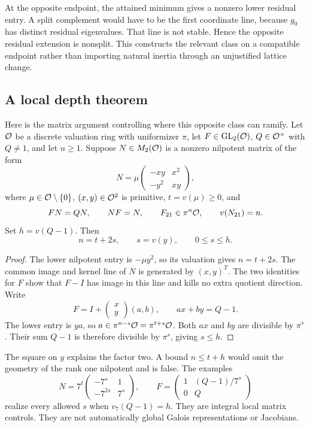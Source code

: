 At the opposite endpoint, the attained minimum gives a nonzero lower residual entry. A split complement would have to be the first coordinate line, because $g_0$ has distinct residual eigenvalues. That line is not stable. Hence the opposite residual extension is nonsplit. This constructs the relevant class on a compatible endpoint rather than importing natural inertia through an unjustified lattice change.

\subsection{A local depth theorem}
Here is the matrix argument controlling where this opposite class can ramify. Let $\mathcal O$ be a discrete valuation ring with uniformizer $\pi$, let $F\in\mathrm{GL}_2(\mathcal O)$, $Q\in\mathcal O^\times$ with $Q\ne1$, and let $n\ge1$. Suppose $N\in M_2(\mathcal O)$ is a nonzero nilpotent matrix of the form
\[
N=\mu\begin{pmatrix}-xy&x^2\\-y^2&xy\end{pmatrix},
\]
where $\mu\in\mathcal O\setminus\{0\}$, $(x,y)\in\mathcal O^2$ is primitive, $t=v(\mu)\ge0$, and
\[
FN=QN,\qquad NF=N,\qquad F_{21}\in\pi^n\mathcal O,\qquad v(N_{21})=n.
\]
Set $h=v(Q-1)$. Then
\begin{equation}\label{eq:depthlocal}
n=t+2s,\qquad s=v(y),\qquad0\le s\le h.
\end{equation}
\begin{proof}
The lower nilpotent entry is $-\mu y^2$, so its valuation gives $n=t+2s$. The common image and kernel line of $N$ is generated by $(x,y)^T$. The two identities for $F$ show that $F-I$ has image in this line and kills no extra quotient direction. Write
\[
F=I+\begin{pmatrix}x\\y\end{pmatrix}(a,b),\qquad ax+by=Q-1.
\]
The lower entry is $ya$, so $a\in\pi^{n-s}\mathcal O=\pi^{t+s}\mathcal O$. Both $ax$ and $by$ are divisible by $\pi^s$. Their sum $Q-1$ is therefore divisible by $\pi^s$, giving $s\le h$.
\end{proof}
The square on $y$ explains the factor two. A bound $n\le t+h$ would omit the geometry of the rank one nilpotent and is false. The examples
\[
N=7^t\begin{pmatrix}-7^s&1\\-7^{2s}&7^s\end{pmatrix},\qquad
F=\begin{pmatrix}1&(Q-1)/7^s\\0&Q\end{pmatrix}
\]
realize every allowed $s$ when $v_7(Q-1)=h$. They are integral local matrix controls. They are not automatically global Galois representations or Jacobians.

